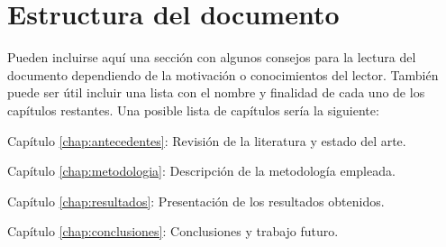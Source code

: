 \section{Estructura del documento}

Pueden incluirse aquí una sección con algunos consejos para la lectura del documento dependiendo de la motivación o conocimientos del lector.  También puede ser útil incluir una lista con el nombre y finalidad de cada uno de los capítulos restantes. Una posible lista de capítulos sería la siguiente:

\begin{definitionlist}
\item[Capítulo \ref{chap:antecedentes}: \nameref{chap:antecedentes}] Revisión de la literatura y estado del arte.
\item[Capítulo \ref{chap:metodologia}: \nameref{chap:metodologia}] Descripción de la metodología empleada.
\item[Capítulo \ref{chap:resultados}: \nameref{chap:resultados}] Presentación de los resultados obtenidos.
\item[Capítulo \ref{chap:conclusiones}: \nameref{chap:conclusiones}] Conclusiones y trabajo futuro.
\end{definitionlist}


